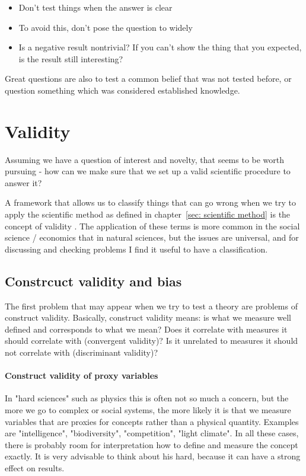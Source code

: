 \documentclass{tufte-book}
\begin{document}
\begin{itemize}
\item Don’t test things when the answer is clear
\item To avoid this, don’t pose the question to widely
\item Is a negative result nontrivial? If you can’t show the thing that you expected, is the result still interesting?
\end{itemize}

Great questions are also to test a common belief that was not tested before, or question something which was considered established knowledge.

\section{Validity}

Assuming we have a question of interest and novelty, that seems to be worth pursuing - how can we make sure that we set up a valid scientific procedure to answer it?


A framework that allows us to classify things that can go wrong when we try to apply the scientific method as defined in chapter~\ref{sec: scientific method} is the concept of validity \citep[][]{Shadish-Experimentalandquasi-2002}. The application of these terms is more common in the social science / economics that in natural sciences, but the issues are universal, and for discussing and checking problems I find it useful to have a classification.

\subsection{Constrcuct validity and bias}

The first problem that may appear when we try to test a theory are problems of construct validity. Basically, construct validity means: is what we measure well defined and corresponds to what we mean? Does it correlate with measures it should correlate with (convergent validity)? Is it unrelated to measures it should not correlate with (discriminant validity)?

\paragraph{Construct validity of proxy variables} In "hard sciences" such as physics this is often not so much a concern, but the more we go to complex or social systems, the more likely it is that we measure variables that are proxies for concepts rather than a physical quantity. Examples are "intelligence", "biodiversity", "competition", "light climate". In all these cases, there is probably room for interpretation how to define and measure the concept exactly. It is very advisable to think about his hard, because it can have a strong effect on results.
\end{document}
